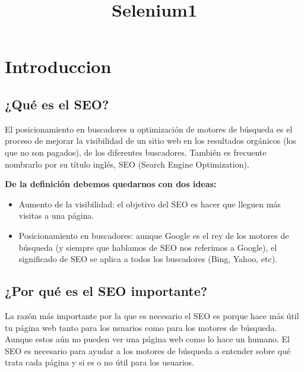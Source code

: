 \documentclass[11pt]{article}
\title{Selenium1}
\providecommand{\tightlist}{%
      \setlength{\itemsep}{0pt}\setlength{\parskip}{0pt}}
\begin{document}
    
    \maketitle
    
    

    
    \hypertarget{introduccion}{%
\section{Introduccion}\label{introduccion}}

    \hypertarget{quuxe9-es-el-seo}{%
\subsection{¿Qué es el SEO?}\label{quuxe9-es-el-seo}}

    El posicionamiento en buscadores u optimización de motores de búsqueda
es el proceso de mejorar la visibilidad de un sitio web en los
resultados orgánicos (los que no son pagados), de los diferentes
buscadores. También es frecuente nombrarlo por su título inglés, SEO
(Search Engine Optimization).

\textbf{De la definición debemos quedarnos con dos ideas:}

\begin{itemize}
\tightlist
\item
  Aumento de la visibilidad: el objetivo del SEO es hacer que lleguen
  más visitas a una página.
\item
  Posicionamiento en buscadores: aunque Google es el rey de los motores
  de búsqueda (y siempre que hablamos de SEO nos referimos a Google), el
  significado de SEO se aplica a todos los buscadores (Bing, Yahoo,
  etc).
\end{itemize}

    

    \hypertarget{por-quuxe9-es-el-seo-importante}{%
\subsection{¿Por qué es el SEO
importante?}\label{por-quuxe9-es-el-seo-importante}}

La razón más importante por la que es necesario el SEO es porque hace
más útil tu página web tanto para los usuarios como para los motores de
búsqueda. Aunque estos aún no pueden ver una página web como lo hace un
humano. El SEO es necesario para ayudar a los motores de búsqueda a
entender sobre qué trata cada página y si es o no útil para los
usuarios.
\end{document}
